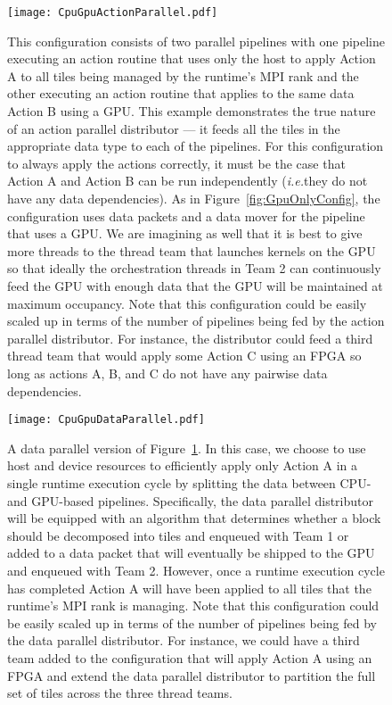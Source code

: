 \documentclass{article}
\newcommand{\ie}{\textit{i.e.}}   %
\begin{document}
\begin{appendices}
\begin{figure}[!hp]
\begin{center}
\texttt{[image: CpuGpuActionParallel.pdf]}
\caption[]{This configuration consists of two parallel pipelines with one
pipeline executing an action routine that uses only the host to apply Action A
to all tiles being managed by the runtime's MPI rank and the other executing an
action routine that applies to the same data Action B using a GPU.  This example
demonstrates the true nature of an action parallel distributor --- it feeds all
the tiles in the appropriate data type to each of the pipelines.  For this
configuration to always apply the actions correctly, it must be the case that
Action A and Action B can be run independently (\ie they do not have any data
dependencies).  As in Figure~\ref{fig:GpuOnlyConfig}, the configuration uses
data packets and a data mover for the pipeline that uses a GPU.  We are
imagining as well that it is best to give more threads to the thread team that
launches kernels on the GPU so that ideally the orchestration threads in
Team 2 can continuously feed the GPU with enough data that the GPU will be
maintained at maximum occupancy.  Note that this configuration could be easily
scaled up in terms of the number of pipelines being fed by the action parallel
distributor.  For instance, the distributor could feed a third thread team that
would apply some Action C using an FPGA so long as actions A, B, and C do not
have any pairwise data dependencies.}
\label{fig:CpuGpuActionPConfig}
\end{center}
\end{figure}

\begin{figure}[!hp]
\begin{center}
\texttt{[image: CpuGpuDataParallel.pdf]}
\caption[]{A data parallel version of Figure~\ref{fig:CpuGpuActionPConfig}.  In
this case, we choose to use host and device resources to efficiently apply only
Action A in a single runtime execution cycle by splitting the data between CPU-
and GPU-based pipelines.  Specifically, the data parallel distributor will be
equipped with an algorithm that determines whether a block should be decomposed
into tiles and enqueued with Team 1 or added to a data packet that will
eventually be shipped to the GPU and enqueued with Team 2.  However, once a
runtime execution cycle has completed Action A will have been applied to all
tiles that the runtime's MPI rank is managing.  Note that this configuration
could be easily scaled up in terms of the number of pipelines being fed by the
data parallel distributor.  For instance, we could have a third team added to
the configuration that will apply Action A using an FPGA and extend the data
parallel distributor to partition the full set of tiles across the three thread
teams.}
\label{fig:CpuGpuDataPConfig}
\end{center}
\end{figure}


\end{appendices}
\end{document}
